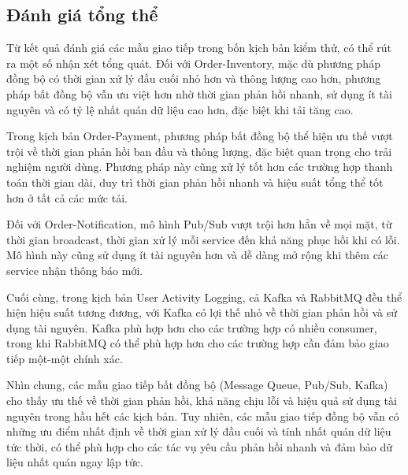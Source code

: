 \subsection{Đánh giá tổng thể}
Từ kết quả đánh giá các mẫu giao tiếp trong bốn kịch bản kiểm thử, có thể rút ra một số nhận xét tổng quát. Đối với Order-Inventory, mặc dù phương pháp đồng bộ có thời gian xử lý đầu cuối nhỏ hơn và thông lượng cao hơn, phương pháp bất đồng bộ vẫn ưu việt hơn nhờ thời gian phản hồi nhanh, sử dụng ít tài nguyên và có tỷ lệ nhất quán dữ liệu cao hơn, đặc biệt khi tải tăng cao.

Trong kịch bản Order-Payment, phương pháp bất đồng bộ thể hiện ưu thế vượt trội về thời gian phản hồi ban đầu và thông lượng, đặc biệt quan trọng cho trải nghiệm người dùng. Phương pháp này cũng xử lý tốt hơn các trường hợp thanh toán thời gian dài, duy trì thời gian phản hồi nhanh và hiệu suất tổng thể tốt hơn ở tất cả các mức tải.

Đối với Order-Notification, mô hình Pub/Sub vượt trội hơn hẳn về mọi mặt, từ thời gian broadcast, thời gian xử lý mỗi service đến khả năng phục hồi khi có lỗi. Mô hình này cũng sử dụng ít tài nguyên hơn và dễ dàng mở rộng khi thêm các service nhận thông báo mới.

Cuối cùng, trong kịch bản User Activity Logging, cả Kafka và RabbitMQ đều thể hiện hiệu suất tương đương, với Kafka có lợi thế nhỏ về thời gian phản hồi và sử dụng tài nguyên. Kafka phù hợp hơn cho các trường hợp có nhiều consumer, trong khi RabbitMQ có thể phù hợp hơn cho các trường hợp cần đảm bảo giao tiếp một-một chính xác.

Nhìn chung, các mẫu giao tiếp bất đồng bộ (Message Queue, Pub/Sub, Kafka) cho thấy ưu thế về thời gian phản hồi, khả năng chịu lỗi và hiệu quả sử dụng tài nguyên trong hầu hết các kịch bản. Tuy nhiên, các mẫu giao tiếp đồng bộ vẫn có những ưu điểm nhất định về thời gian xử lý đầu cuối và tính nhất quán dữ liệu tức thời, có thể phù hợp cho các tác vụ yêu cầu phản hồi nhanh và đảm bảo dữ liệu nhất quán ngay lập tức.